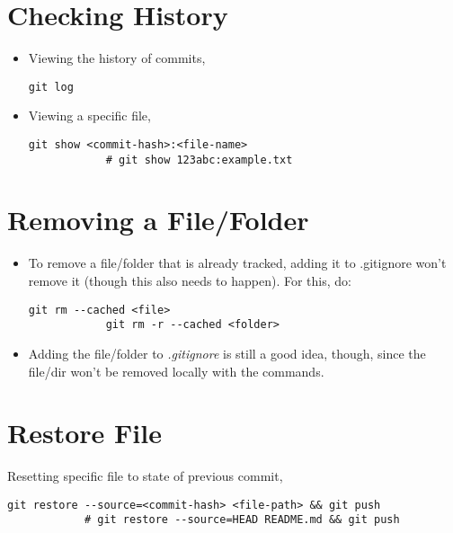 \documentclass[12pt, a4paper]{scrbook}
\numberwithin{equation}{section}
\theoremstyle{definition}
\theoremstyle{definition}
\begin{document}
	\section{Checking History}

	\begin{itemize}
		\item Viewing the history of commits,
		
		\begin{lstlisting}[style=mystylebash, label=alg:history1, xleftmargin=\parindent]
			git log
		\end{lstlisting}
	
		\item Viewing a specific file,
		
		\begin{lstlisting}[style=mystylebash, label=alg:history1, xleftmargin=\parindent]
			git show <commit-hash>:<file-name>
			# git show 123abc:example.txt
		\end{lstlisting}
	
	\end{itemize}
	
	\section{Removing a File/Folder}
	
	\begin{itemize}
		\item To remove a file/folder that is already tracked, adding it to .gitignore won’t remove it (though this also needs to happen). For this, do:
		
		\begin{lstlisting}[style=mystylebash, label=alg:git_remove, xleftmargin=\parindent]
			git rm --cached <file>
			git rm -r --cached <folder>
		\end{lstlisting}

		\item Adding the file/folder to \textit{.gitignore} is still a good idea, though, since the file/dir won’t be removed locally with the commands.
	\end{itemize}
	
	\section{Restore File}
	
		Resetting specific file to state of previous commit,
		
		\begin{lstlisting}[style=mystylebash, label=alg:git_restore, xleftmargin=\parindent]
			git restore --source=<commit-hash> <file-path> && git push
			# git restore --source=HEAD README.md && git push
		\end{lstlisting}
	
\end{document}
